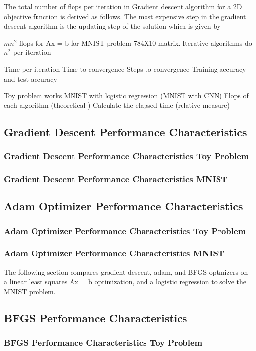 \documentclass[10pt,twocolumn]{article}
\begin{document}
The total number of flops per iteration in Gradient descent algorithm for a 2D objective function is derived as follows. The most expensive step in the gradient descent algorithm is the updating step of the solution which is given by 


$mn^2$ flops for Ax = b for MNIST problem 784X10 matrix. 
Iterative algorithms do $n^2$ per iteration

Time per iteration
Time to convergence 
Steps to convergence
Training accuracy and test accuracy 

Toy problem works
MNIST with logistic regression
(MNIST with CNN)
Flops of each algorithm (theoretical )
Calculate the elapsed time (relative measure)


\subsection{Gradient Descent Performance Characteristics}
\subsubsection{Gradient Descent Performance Characteristics Toy Problem}
\subsubsection{Gradient Descent Performance Characteristics MNIST}

\subsection{Adam Optimizer Performance Characteristics}
\subsubsection{Adam Optimizer Performance Characteristics Toy Problem}
\subsubsection{Adam Optimizer Performance Characteristics MNIST}
The following section compares gradient descent, adam, and BFGS optmizers on a linear least squares Ax = b optimization, and a logistic regression to solve the MNIST problem.


\subsection{BFGS Performance Characteristics}
\subsubsection{BFGS Performance Characteristics Toy Problem}
\end{document}
